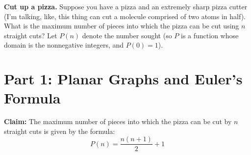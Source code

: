 \documentclass[10pt, AMS Euler]{article}
\begin{document}
		\item {\bf Cut up a pizza.}  Suppose you have a pizza and an extremely sharp pizza cutter (I'm talking, like, this thing can cut a molecule comprised of two atoms in half).  
		What is the maximum number of pieces into which the pizza can be cut using $n$ straight cuts?  Let $P(n)$ denote the 
		number sought (so $P$ is a function whose domain is the nonnegative integers, and $P(0) =1$).
		
		\section*{Part 1: Planar Graphs and Euler’s Formula}

\noindent\textbf{Claim:} The maximum number of pieces into which the pizza can be cut by $n$ straight cuts is given by the formula:
    \[
    P(n) = \frac{n(n+1)}{2} + 1
    \]
    
\end{document}
